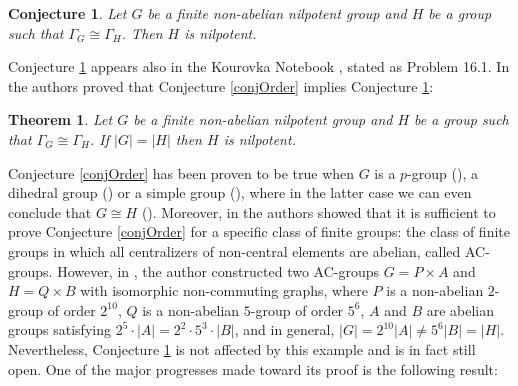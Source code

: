 \documentclass[12pt]{amsart}
\theoremstyle{definition}
\theoremstyle{remark}
\theoremstyle{plain}
\theoremstyle{plain}
\theoremstyle{plain}
\newtheorem{conj}{Conjecture}
\theoremstyle{plain}
\theoremstyle{plain}
\newtheorem{theorem}[definition]{Theorem}
\theoremstyle{remark}
\theoremstyle{remark}
\theoremstyle{definition}
\begin{document}
\begin{conj}\cite[Conjecture 3.25]{AAM}\label{conjNilp} Let $G$ be a finite non-abelian nilpotent group and $H$ be a group such that $\Gamma_G \cong \Gamma_H$. Then $H$ is nilpotent.
\end{conj}

Conjecture \ref{conjNilp} appears also in the Kourovka Notebook \cite{KM}, stated as Problem 16.1. 
 In \cite[Theorem 3.24]{AAM} the authors proved that Conjecture \ref{conjOrder} implies Conjecture \ref{conjNilp}:

 \begin{theorem}\label{same.order}
Let $G$ be a finite non-abelian nilpotent group and $H$ be a group such that $\Gamma_G \cong \Gamma_H$. If $|G| = |H|$ then $H$ is nilpotent.
 \end{theorem}
 
Conjecture \ref{conjOrder} 
has been proven to be true when $G$ is a $p$-group (\cite[Theorem 1.2]{non.comm.p.groups}), a dihedral group (\cite[Proposition 3.19]{AAM}) or a simple group (\cite[Theorem A]{dar}), where in the latter case we can even conclude that $G \cong H$ (\cite[Theorem 1.1]{SW}). Moreover, in \cite[Proposition 3.3]{AAM} the authors showed that it is sufficient to prove Conjecture \ref{conjOrder}  for a specific class of finite groups: the class of finite groups in which all centralizers of non-central elements are abelian, called AC-groups. 
 However, in \cite{counter.non.comm}, the author constructed two AC-groups $G = P \times A$ and $H = Q \times B$ with isomorphic non-commuting graphs, where $P$ is a non-abelian $2$-group of order $2^{10}$, $Q$ is a non-abelian $5$-group of order $5^6$, $A$ and $B$ are abelian groups satisfying $2^5\cdot|A|=2^2 \cdot 5^3 \cdot |B|$, and in general, $|G| = 2^{10}|A| \neq 5^6|B| = |H|$. 
 Nevertheless, Conjecture \ref{conjNilp} is not affected by this example and is in fact still open. One of the major progresses made toward its proof is the following result:
 
\end{document}
